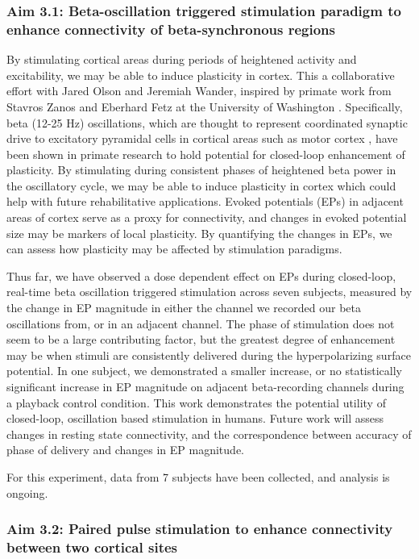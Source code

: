 \subsubsection{Aim 3.1: Beta-oscillation triggered stimulation paradigm to enhance connectivity of beta-synchronous regions}

By stimulating cortical areas during periods of heightened activity and excitability, we may be able to induce plasticity in cortex. This a collaborative effort with Jared Olson and Jeremiah Wander, inspired by primate work from Stavros Zanos and Eberhard Fetz at the University of Washington \cite{Zanos2013}. Specifically, beta (12-25 Hz) oscillations, which are thought to represent coordinated synaptic drive to excitatory pyramidal cells in cortical areas such as motor cortex \cite{Sherman2016}, have been shown in primate research to hold potential for closed-loop enhancement of plasticity. By stimulating during consistent phases of heightened beta power in the oscillatory cycle, we may be able to induce plasticity in cortex which could help with future rehabilitative applications. Evoked potentials (EPs) in adjacent areas of cortex serve as a proxy for connectivity, and changes in evoked potential size may be markers of local plasticity. By quantifying the changes in EPs, we can assess how plasticity may be affected by stimulation paradigms. 

Thus far, we have observed a dose dependent effect on EPs during closed-loop, real-time beta oscillation triggered stimulation across seven subjects, measured by the change in EP magnitude in either the channel we recorded our beta oscillations from, or in an adjacent channel. The phase of stimulation does not seem to be a large contributing factor, but the greatest degree of enhancement may be when stimuli are consistently delivered during the hyperpolarizing surface potential. In one subject, we demonstrated a smaller increase, or no statistically significant increase in EP magnitude on adjacent beta-recording channels during a playback control condition. This work demonstrates the potential utility of closed-loop, oscillation based stimulation in humans. Future work will assess changes in resting state connectivity, and the correspondence between accuracy of phase of delivery and changes in EP magnitude.

For this experiment, data from 7 subjects have been collected, and analysis is ongoing. 

\subsubsection{Aim 3.2:  Paired pulse stimulation to enhance connectivity between two cortical sites}

